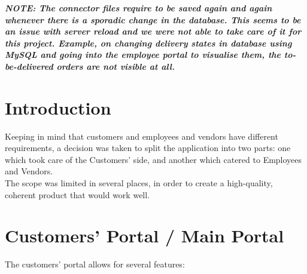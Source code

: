 \documentclass[12pt]{report}
\begin{document}
    \textbf{\textit{NOTE: The connector files require to be saved again and again whenever there is a sporadic change in the database. This seems to be an issue with server reload and we were not able to take care of it for this project.
    Example, on changing delivery states in database using MySQL and going into the employee portal to visualise them, the to-be-delivered orders are not visible at all.}}
    \section*{Introduction}
    Keeping in mind that customers and employees and vendors have different requirements, a decision was taken to split the application into two parts: one which took care of the Customers' side, and another which catered to Employees and Vendors.
    \\
    The scope was limited in several places, in order to create a high-quality, coherent product that would work well.
    \\
    \section{Customers' Portal / Main Portal}
    The customers' portal allows for several features:
    
\end{document}
